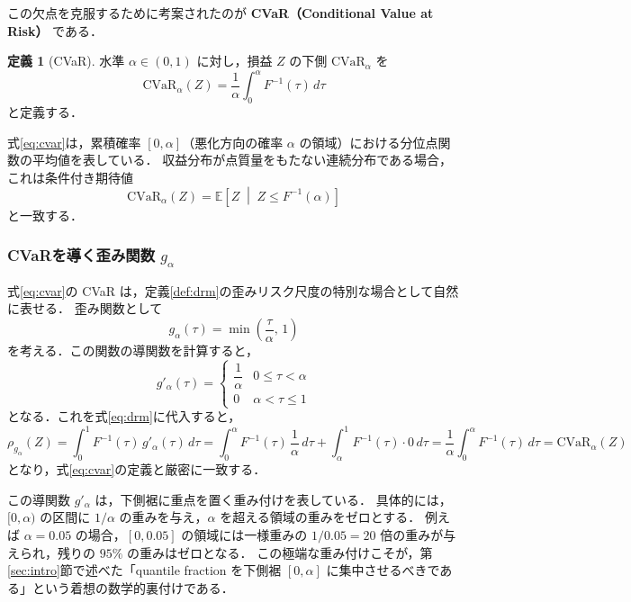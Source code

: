 \documentclass[a4paper,10pt]{jsarticle}
\theoremstyle{definition}
\newtheorem{definition}{定義}[section]
\newcommand{\CVaR}{\mathrm{CVaR}}
\renewcommand{\Finv}{F^{-1}}
\newcommand{\E}{\mathbb{E}}
\begin{document}
この欠点を克服するために考案されたのが \textbf{CVaR（Conditional Value at Risk）} である．

\begin{definition}[CVaR]
\label{def:cvar}
水準 $\alpha\in(0,1)$ に対し，損益 $Z$ の下側 $\CVaR_\alpha$ を
\begin{equation}
  \CVaR_\alpha(Z) = \frac{1}{\alpha}\int_0^\alpha\Finv(\tau)\,d\tau
  \label{eq:cvar}
\end{equation}
と定義する．
\end{definition}

式\eqref{eq:cvar}は，累積確率 $[0, \alpha]$（悪化方向の確率 $\alpha$ の領域）における分位点関数の平均値を表している．
収益分布が点質量をもたない連続分布である場合，これは条件付き期待値
\begin{equation}
  \CVaR_\alpha(Z) = \E\left[Z \;\middle|\; Z \le \Finv(\alpha)\right]
\end{equation}
と一致する．

\subsubsection{CVaRを導く歪み関数 $g_\alpha$}
式\eqref{eq:cvar}の CVaR は，定義\ref{def:drm}の歪みリスク尺度の特別な場合として自然に表せる．
歪み関数として
\begin{equation}
  g_\alpha(\tau) = \min\left(\frac{\tau}{\alpha},\,1\right)
  \label{eq:g-cvar}
\end{equation}
を考える．この関数の導関数を計算すると，
\begin{equation}
  g'_\alpha(\tau) = \begin{cases} \dfrac{1}{\alpha} & 0 \le \tau < \alpha \\[0.2cm] 0 & \alpha < \tau \le 1 \end{cases}
  \label{eq:gprime-cvar}
\end{equation}
となる．これを式\eqref{eq:drm}に代入すると，
\begin{equation}
  \rho_{g_\alpha}(Z) = \int_0^1 \Finv(\tau)\,g'_\alpha(\tau)\,d\tau = \int_0^\alpha \Finv(\tau)\,\frac{1}{\alpha}\,d\tau + \int_\alpha^1 \Finv(\tau)\cdot 0\,d\tau = \frac{1}{\alpha}\int_0^\alpha \Finv(\tau)\,d\tau = \CVaR_\alpha(Z)
\end{equation}
となり，式\eqref{eq:cvar}の定義と厳密に一致する．

この導関数 $g'_\alpha$ は，下側裾に重点を置く重み付けを表している．
具体的には，$[0, \alpha)$ の区間に $1/\alpha$ の重みを与え，$\alpha$ を超える領域の重みをゼロとする．
例えば $\alpha=0.05$ の場合，$[0, 0.05]$ の領域には一様重みの $1/0.05 = 20$ 倍の重みが与えられ，残りの $95\%$ の重みはゼロとなる．
この極端な重み付けこそが，第\ref{sec:intro}節で述べた「quantile fraction を下側裾 $[0, \alpha]$ に集中させるべきである」という着想の数学的裏付けである．
\end{document}
